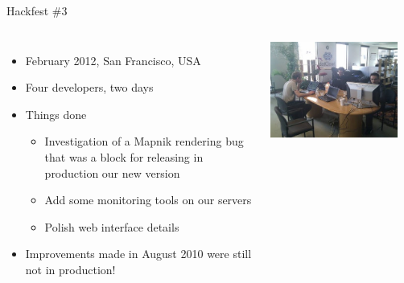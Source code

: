 \documentclass{beamer}
\begin{document}
\begin{frame}{Hackfest \#3}
  \begin{columns}
  \begin{itemize}
  \item February 2012, San Francisco, USA
  \item Four developers, two days
  \item Things done
    \begin{itemize}
    \item Investigation of a Mapnik rendering bug that was a block for
      releasing in production our new version
    \item Add some monitoring tools on our servers
    \item Polish web interface details
    \end{itemize}
  \item Improvements made in August 2010 were still not in production!
  \end{itemize}
  \includegraphics[width=0.9\textwidth]{hackfest-3.jpg}
  \end{columns}
\end{frame}
\end{document}
